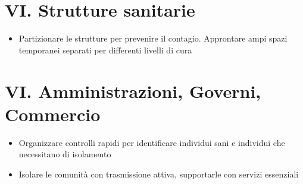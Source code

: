\documentclass[onecolumn,journal]{IEEEtran}
\begin{document}
\begin{multicols}{2}
\begin{itemize}
\end{itemize}

\section*{VI. Strutture sanitarie}

\begin{itemize}
\item Partizionare le strutture per prevenire il contagio. Approntare ampi spazi temporanei separati per differenti livelli di cura
\end{itemize}

\section*{VI. Amministrazioni, Governi, Commercio}

\begin{itemize}
\item Organizzare controlli rapidi per identificare individui sani e individui che necessitano di isolamento
\item Isolare le comunità con trasmissione attiva, supportarle con servizi essenziali
\end{itemize}



\end{multicols}
\end{document}
